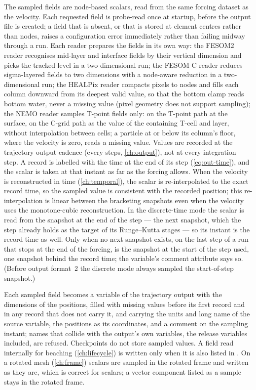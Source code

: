 The sampled fields are node-based scalars, read from the same forcing dataset as the
velocity. Each requested field is probe-read once at startup, before the output file is created; a
field that is absent, or that is stored at element centres rather than nodes, raises a configuration
error immediately rather than failing midway through a run. Each reader prepares the fields in its own
way: the FESOM2 reader recognises mid-layer and interface fields by their vertical dimension and picks
the tracked level in a two-dimensional run; the FESOM-C reader reduces sigma-layered fields to two
dimensions with a node-aware reduction in a two-dimensional run; the HEALPix reader compacts pixels to nodes and fills each
column downward from its deepest valid value, so that the bottom clamp reads bottom water, never a
missing value (pixel geometry does not support sampling); the NEMO reader samples T-point fields
only: on the T-point path at the surface, on the C-grid path as the value of the containing T-cell
and layer, without interpolation between cells; a particle at or below its column's floor, where the
velocity is zero, reads a missing value. Values are recorded at the
trajectory output cadence (every  steps, \cref{ch:output}), not at
every integration step. A record is labelled with the time at the end of its step (\cref{eq:out-time}), and
the scalar is taken at that instant as far as the forcing allows. When the velocity is reconstructed in time
(\cref{ch:temporal}), the scalar is re-interpolated to the exact record time, so the
sampled value is consistent with the recorded position; this re-interpolation is linear between
the bracketing snapshots even when the velocity uses the monotone-cubic reconstruction. In the
discrete-time mode the scalar is read from the snapshot at the end of the step --- the next snapshot, which the
step already holds as the target of its Runge--Kutta stages --- so its instant is the record time as well.
Only when no next snapshot exists, on the last step of a run that stops at the end of the forcing, is the
snapshot at the start of the step used, one snapshot behind the record time; the variable's comment
attribute says so. (Before output format~2 the discrete mode always sampled the start-of-step snapshot.)

Each sampled field becomes a variable of the trajectory output with the dimensions of the positions,
filled with missing values before its first record and in any record that does not carry it, and carrying
the units and long name of the source variable, the positions as its coordinates, and a comment on the
sampling instant; names that collide with the output's own variables, the release variables included, are
refused. Checkpoints do not
store sampled values. A field read internally for beaching (\cref{ch:lifecycle}) is written only when it
is also listed in . On a rotated mesh (\cref{ch:frame}) scalars are sampled in the
rotated frame and written as they are, which is correct for scalars; a vector component listed as a
sample stays in the rotated frame.

